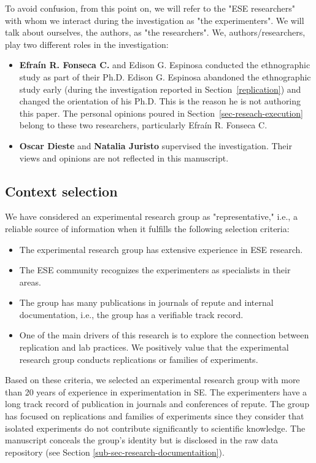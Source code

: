 To avoid confusion, from this point on, we will refer to the "ESE researchers" with whom we interact during the investigation as "the experimenters". We will talk about ourselves, the authors, as "the researchers". We, authors/researchers, play two different roles in the investigation:

\begin{itemize}
\item \textbf{Efra\'in R. Fonseca C.} and Edison G. Espinosa conducted the ethnographic study as part of their Ph.D. Edison G. Espinosa abandoned the ethnographic study early (during the investigation reported in Section~\ref{replication}) and changed the orientation of his Ph.D. This is the reason he is not authoring this paper. The personal opinions poured in Section~\ref{sec-reseach-execution} belong to these two researchers, particularly Efra\'in R. Fonseca C.
\item \textbf{Oscar Dieste} and \textbf{Natalia Juristo} supervised the investigation. Their views and opinions are not reflected in this manuscript.
\end{itemize}

\subsection{Context selection}
We have considered an experimental research group as "representative," i.e., a reliable source of information when it fulfills the following selection criteria:

\begin{itemize}
	\item The experimental research group has extensive experience in ESE research.
	\item The ESE community recognizes the experimenters as specialists in their areas.
	\item The group has many publications in journals of repute and internal documentation, i.e., the group has a verifiable track record.
\item One of the main drivers of this research is to explore the connection between replication and lab practices. We positively value that the experimental research group conducts replications or families of experiments.
\end{itemize}

Based on these criteria, we selected an experimental research group with more than 20 years of experience in experimentation in SE. The experimenters have a long track record of publication in journals and conferences of repute. The group has focused on replications and families of experiments since they consider that isolated experiments do not contribute significantly to scientific knowledge. The manuscript conceals the group's identity but is disclosed in the raw data repository (see Section \ref{sub-sec-research-documentaition}).

